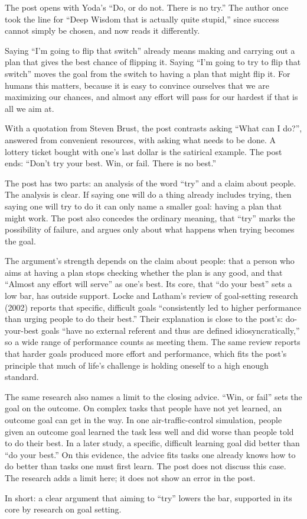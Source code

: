\begin{afterword}
\summaryhead

The post opens with Yoda's ``Do, or do not. There is no try.'' The author once took the line for ``Deep Wisdom that is actually quite stupid,'' since success cannot simply be chosen, and now reads it differently.

Saying ``I'm going to flip that switch'' already means making and carrying out a plan that gives the best chance of flipping it. Saying ``I'm going to try to flip that switch'' moves the goal from the switch to having a plan that might flip it. For humans this matters, because it is easy to convince ourselves that we are maximizing our chances, and almost any effort will pass for our hardest if that is all we aim at.

With a quotation from Steven Brust, the post contrasts asking ``What can I do?'', answered from convenient resources, with asking what needs to be done. A lottery ticket bought with one's last dollar is the satirical example. The post ends: ``Don't try your best. Win, or fail. There is no best.''

\responsehead

The post has two parts: an analysis of the word ``try'' and a claim about people. The analysis is clear. If saying one will do a thing already includes trying, then saying one will try to do it can only name a smaller goal: having a plan that might work. The post also concedes the ordinary meaning, that ``try'' marks the possibility of failure, and argues only about what happens when trying becomes the goal.

The argument's strength depends on the claim about people: that a person who aims at having a plan stops checking whether the plan is any good, and that ``Almost any effort will serve'' as one's best. Its core, that ``do your best'' sets a low bar, has outside support. Locke and Latham's review of goal-setting research (2002) reports that specific, difficult goals ``consistently led to higher performance than urging people to do their best.'' Their explanation is close to the post's: do-your-best goals ``have no external referent and thus are defined idiosyncratically,'' so a wide range of performance counts as meeting them. The same review reports that harder goals produced more effort and performance, which fits the post's principle that much of life's challenge is holding oneself to a high enough standard.

The same research also names a limit to the closing advice. ``Win, or fail'' sets the goal on the outcome. On complex tasks that people have not yet learned, an outcome goal can get in the way. In one air-traffic-control simulation, people given an outcome goal learned the task less well and did worse than people told to do their best. In a later study, a specific, difficult learning goal did better than ``do your best.'' On this evidence, the advice fits tasks one already knows how to do better than tasks one must first learn. The post does not discuss this case. The research adds a limit here; it does not show an error in the post.

In short: a clear argument that aiming to ``try'' lowers the bar, supported in its core by research on goal setting.
\end{afterword}
